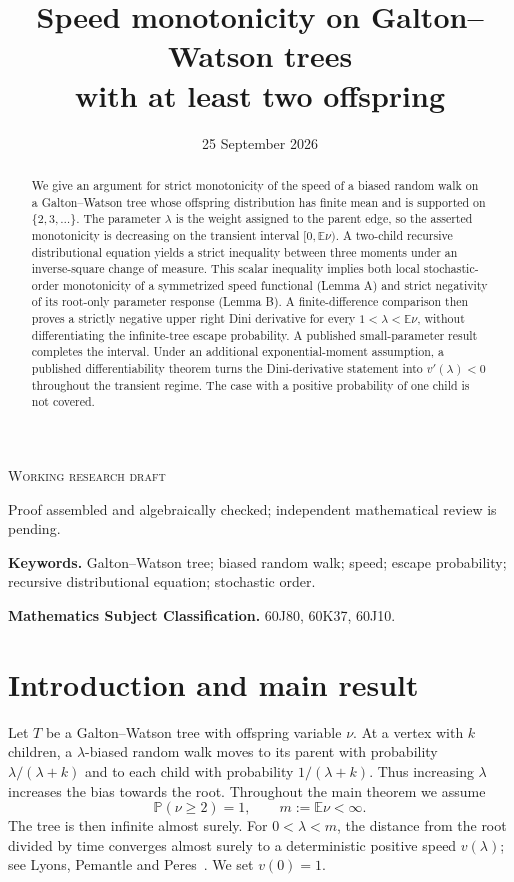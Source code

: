 \documentclass[11pt,a4paper]{article}
\title{\vspace{-1.4em}\textbf{Speed monotonicity on Galton--Watson trees\\with at least two offspring}}
\author{}
\date{25 September 2026}
\numberwithin{equation}{section}
\theoremstyle{plain}
\theoremstyle{definition}
\theoremstyle{remark}
\newcommand{\E}{\mathbb E}
\newcommand{\Prob}{\mathbb P}
\begin{document}
\maketitle
\vspace{-1.9em}
\begin{center}
\small\textsc{Working research draft}\par
\footnotesize Proof assembled and algebraically checked; independent mathematical review is pending.
\end{center}
\vspace{0.3em}

\begin{abstract}
We give an argument for strict monotonicity of the speed of a biased random
walk on a Galton--Watson tree whose offspring distribution has finite mean
and is supported on $\{2,3,\ldots\}$.  The parameter $\lambda$ is the weight
assigned to the parent edge, so the asserted monotonicity is decreasing on
the transient interval $[0,\E\nu)$.  A two-child recursive distributional
equation yields a strict inequality between three moments under an
inverse-square change of measure.  This scalar inequality implies both
local stochastic-order monotonicity of a symmetrized speed functional
(Lemma A) and strict negativity of its root-only parameter response
(Lemma B).  A finite-difference comparison then proves a strictly negative
upper right Dini derivative for every $1<\lambda<\E\nu$, without
differentiating the infinite-tree escape probability.  A published
small-parameter result completes the interval.  Under an additional
exponential-moment assumption, a published differentiability theorem turns
the Dini-derivative statement into $v'(\lambda)<0$ throughout the transient
regime.  The case with a positive probability of one child is not covered.
\end{abstract}

\noindent\textbf{Keywords.} Galton--Watson tree; biased random walk; speed;
escape probability; recursive distributional equation; stochastic order.

\medskip
\noindent\textbf{Mathematics Subject Classification.} 60J80, 60K37, 60J10.

\section{Introduction and main result}\label{sec:intro}

Let $T$ be a Galton--Watson tree with offspring variable $\nu$.  At a vertex
with $k$ children, a $\lambda$-biased random walk moves to its parent with
probability $\lambda/(\lambda+k)$ and to each child with probability
$1/(\lambda+k)$.  Thus increasing $\lambda$ increases the bias towards the
root.  Throughout the main theorem we assume
\begin{equation}\label{eq:assumptions}
 \Prob(\nu\ge2)=1,
 \qquad m:=\E\nu<\infty.
\end{equation}
The tree is then infinite almost surely.  For $0<\lambda<m$, the distance
from the root divided by time converges almost surely to a deterministic
positive speed $v(\lambda)$; see Lyons, Pemantle and Peres~\cite{LPP96}.
We set $v(0)=1$.
\end{document}

